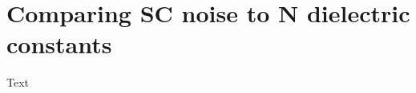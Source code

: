 \documentclass[11pt]{article}
\begin{document}
	\graphicspath{{figures/}}

	\section{Comparing SC noise to N dielectric constants} \label{sec:intro}

	Text
	\newpage
	\printbibliography
\end{document}
